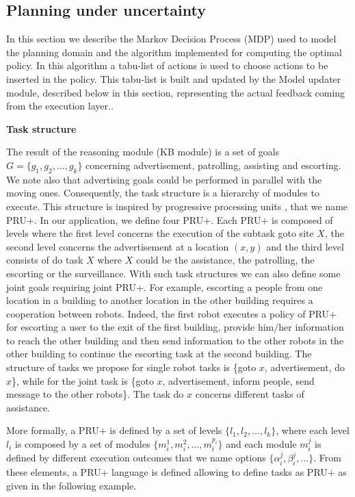 \subsection{Planning under uncertainty}

In this section we describe the Markov Decision Process (MDP) used to model the \coaches planning domain and the algorithm implemented for computing the optimal policy.
In this algorithm a tabu-list of actions is used to choose actions to be inserted in the policy.
This tabu-list is built and updated by the Model updater module, described below in this section, representing the actual feedback coming from the execution layer..

\vspace{1em}
\noindent
{\bf Task structure}

The result of the reasoning module (KB module) is a set of goals $G = \{ g_{1}, g_{2}, \ldots, g_{k} \}$ concerning advertisement, patrolling, assisting and escorting.  We note also that advertising goals could be performed in parallel with the moving ones.  Consequently, the task structure is a hierarchy of modules to execute. This structure is  inspired by progressive processing units \cite{CarMouIjcai01}, that we  name PRU+. In our application, we define four PRU+. Each PRU+ is composed of levels where the first level concerns the execution of the subtask {\sc goto site $X$}, the second level concerns the advertisement at a location $(x,y)$ and the third level consists of {\sc do task $X$} where $X$ could be  the assistance, the patrolling, the escorting or the surveillance.%
With such task structures we can also define some joint goals requiring joint PRU+.  For example, escorting a people from one location in a building to another location in the other building requires a cooperation between robots. Indeed, the first robot executes a policy of PRU+ for escorting a user to the exit of the first building, provide him/her information to reach the other building and then send information to the other robots in the other building to continue the escorting task at the second building. The structure of tasks we propose for single robot tasks is  {\sc \{goto $x$, advertisement, do $x$\}}, while for the joint task is {\sc \{goto $x$, advertisement, inform people, send message to the other robots\}}. 
The task {\sc do $x$} concerns different tasks of assistance. 

More formally, a PRU+ is defined by a set of levels $\{ l_{1}, l_{2}, \ldots, l_{k} \}$, where each level $l_i$ is composed by a set of modules $\{m_{i}^{1}, m_{i}^{2}, \ldots, m_{i}^{p_{i}} \}$ and each module $m_i^j$ is defined by different execution outcomes that we name options $\{ \alpha_{i}^{j}, \beta_{i}^{j}, \ldots \}$.  From these elements, a PRU+ language is defined allowing to define tasks as PRU+ as given in the following example.  

